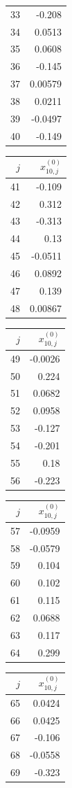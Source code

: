 {\begin{tabular}[t]{r|r}
33 & -0.208 \\
34 & 0.0513 \\
35 & 0.0608 \\
36 & -0.145 \\
37 & 0.00579 \\
38 & 0.0211 \\
39 & -0.0497 \\
40 & -0.149
\end{tabular}\kern4pt
\begin{tabular}[t]{r|r}
$j$ & $x^{(0)}_{10,j}$ \\\hline
41 & -0.109 \\
42 & 0.312 \\
43 & -0.313 \\
44 & 0.13 \\
45 & -0.0511 \\
46 & 0.0892 \\
47 & 0.139 \\
48 & 0.00867
\end{tabular}\kern4pt
\begin{tabular}[t]{r|r}
$j$ & $x^{(0)}_{10,j}$ \\\hline
49 & -0.0026 \\
50 & 0.224 \\
51 & 0.0682 \\
52 & 0.0958 \\
53 & -0.127 \\
54 & -0.201 \\
55 & 0.18 \\
56 & -0.223
\end{tabular}\kern4pt
\begin{tabular}[t]{r|r}
$j$ & $x^{(0)}_{10,j}$ \\\hline
57 & -0.0959 \\
58 & -0.0579 \\
59 & 0.104 \\
60 & 0.102 \\
61 & 0.115 \\
62 & 0.0688 \\
63 & 0.117 \\
64 & 0.299
\end{tabular}\kern4pt
\begin{tabular}[t]{r|r}
$j$ & $x^{(0)}_{10,j}$ \\\hline
65 & 0.0424 \\
66 & 0.0425 \\
67 & -0.106 \\
68 & -0.0558 \\
69 & -0.323 \\

\end{tabular}}
